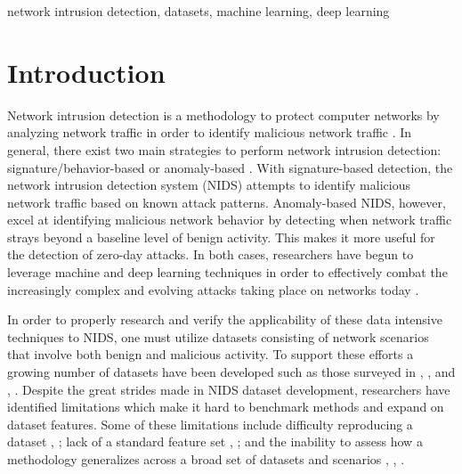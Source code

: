 \documentclass[conference]{IEEEtran}
\begin{document}
\begin{IEEEkeywords}
network intrusion detection, datasets, machine learning, deep learning
\end{IEEEkeywords}

\section{Introduction}

Network intrusion detection is a methodology to protect computer networks by analyzing network traffic in order to identify malicious network traffic \cite{Chou2022}.
In general, there exist two main strategies to perform network intrusion detection:  signature/behavior-based or anomaly-based \cite{yang2022systematic}.
With signature-based detection, the network intrusion detection system (NIDS) attempts to identify malicious network traffic based on known attack patterns.
Anomaly-based NIDS, however, excel at identifying malicious network behavior by detecting when network traffic strays beyond a baseline level of benign activity.
This makes it more useful for the detection of zero-day attacks.
In both cases, researchers have begun to leverage machine and deep learning techniques in order to effectively combat the increasingly complex and evolving attacks taking place on networks today \cite{yang2022systematic}.

In order to properly research and verify the applicability of these data intensive techniques to NIDS, one must utilize datasets consisting of network scenarios that involve both benign and malicious activity.
To support these efforts a growing number of datasets have been developed such as those surveyed in \cite{Chou2022}, \cite{yang2022systematic}, and \cite{ring2019survey}, .
Despite the great strides made in NIDS dataset development, researchers have identified limitations which make it hard to benchmark methods and expand on dataset features.
Some of these limitations include difficulty reproducing a dataset \cite{Chou2022}, \cite{ferriyan2021}; lack of a standard feature set \cite{sarhan_arxiv2021}, \cite{Sarhan2021}; and the inability to assess how a methodology generalizes across a broad set of datasets and scenarios \cite{sarhan2020netflow}, \cite{Sarhan2021}, \cite{wolsing2021ipal}.
\end{document}
